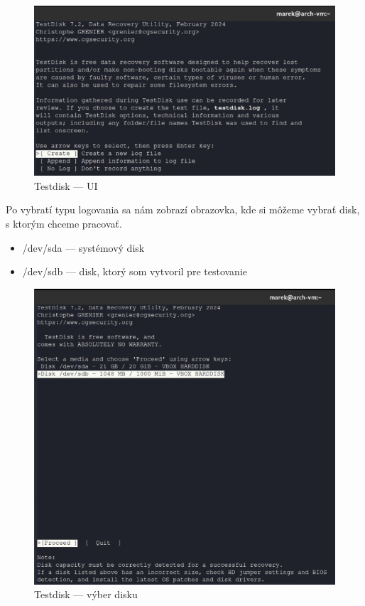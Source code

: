 \documentclass[12pt,oneside,slovak,a4paper]{article}
\begin{document}
\begin{figure}[H]
	\centering
	\includegraphics[scale=0.8]{./images/testdisk_testing/testdisk_UI.png}
	\centering
	\captionsetup{justification=centering,margin=2cm}
	\caption{Testdisk --- UI}
\end{figure}

Po vybratí typu logovania sa nám zobrazí obrazovka, kde si môžeme vybrať disk, s ktorým chceme pracovať.

\begin{spacing}{1.0}	
\begin{itemize}
	\item /dev/sda --- systémový disk
	\item /dev/sdb --- disk, ktorý som vytvoril pre testovanie
\end{itemize}
\end{spacing}


\begin{figure}[H]
	\centering
	\includegraphics[scale=0.8]{./images/testdisk_testing/testdisk_choose_disk.png}
	\centering
	\captionsetup{justification=centering,margin=2cm}
	\caption{Testdisk --- výber disku}
\end{figure}
\end{document}
